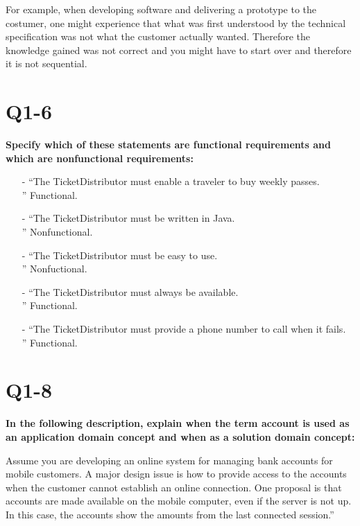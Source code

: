 \documentclass[12pt]{article}
\begin{document}
For example, when developing software and delivering a prototype
to the costumer, one might experience that what was first understood by
the technical specification was not what the customer actually wanted.
Therefore the knowledge gained was not correct and you might have to
start over and therefore it is not sequential.


\pagebreak
\section{Q1-6}
\textbf{Specify which of these statements are functional requirements and which
are nonfunctional requirements:}

\begin{itemize}
\item[-]“The TicketDistributor must enable a traveler to buy weekly passes. \\”	
Functional.

\item[-]“The TicketDistributor must be written in Java. \\”	
Nonfunctional.

\item[-]“The TicketDistributor must be easy to use. \\”	
Nonfuctional.

\item[-]“The TicketDistributor must always be available. \\”	
Functional.

\item[-]“The TicketDistributor must provide a phone number to call when it fails. \\”	
Functional.
\end{itemize}


\pagebreak
\section{Q1-8}
\textbf{In the following description, explain when the term account is used as an
application domain concept and when as a solution domain concept: \\}

Assume you are developing an online system for managing
bank accounts for mobile customers. A major design issue
is how to provide access to the accounts when the customer
cannot establish an online connection. One proposal is that accounts
are made available on the mobile computer, even if the
server is not up. In this case, the accounts show the amounts
from the last connected session.” \\ \\
\end{document}
